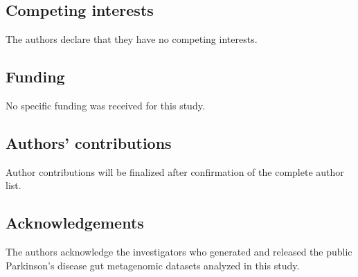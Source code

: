 \documentclass[12pt]{article}
\begin{document}
\subsection*{Competing interests}
The authors declare that they have no competing interests.

\subsection*{Funding}
No specific funding was received for this study.

\subsection*{Authors' contributions}
Author contributions will be finalized after confirmation of the complete author list.

\subsection*{Acknowledgements}
The authors acknowledge the investigators who generated and released the public Parkinson's disease gut metagenomic datasets analyzed in this study.




\end{document}

